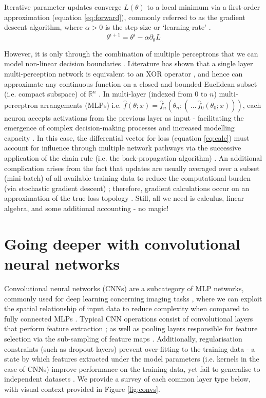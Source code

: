 Iterative parameter updates converge $L(\theta)$ to a local minimum via a first-order approximation (equation \ref{eq:forward}), commonly referred to as the gradient descent algorithm, where $\alpha>0$ is the step-size or `learning-rate' \cite{Maier2019}.
\begin{equation}
\theta^{i+1} = \theta^{i} - \alpha \partial_{\theta} L 
\label{eq:forward}
\end{equation}

However, it is only through the combination of multiple perceptrons that we can model non-linear decision boundaries \cite{Maier2019}. Literature has shown that a single layer multi-perception network is equivalent to an XOR operator \cite{Yanling}, and hence can approximate any continuous function on a closed and bounded Euclidean subset (i.e. compact subspace) of $\mathbb{R}^{n}$ \cite{Cybenko1989}. In multi-layer (indexed from $0$ to $n$) multi-perceptron arrangements (MLPs) i.e. $\hat{f}(\theta; x)= \hat{f}_{n}(\theta_{n};(\,... \,\hat{f}_{0}(\theta_{0}; x)))$, each neuron accepts activations from the previous layer as input - facilitating the emergence of complex decision-making processes and increased modelling capacity \cite{Maier2019}. In this case, the differential vector for loss (equation \ref{eq:calc}) must account for influence through multiple network pathways via the successive application of the chain rule (i.e. the back-propagation algorithm) \cite{Maier2019}. An additional complication arises from the fact that updates are usually averaged over a subset (mini-batch) of all available training data to reduce the computational burden (via stochastic gradient descent) \cite{Sun2019}; therefore, gradient calculations occur on an approximation of the true loss topology \cite{Sun2019}. Still, all we need is calculus, linear algebra, and some additional accounting - no magic!


\section{Going deeper with convolutional neural networks}
Convolutional neural networks (CNNs) are a subcategory of MLP networks, commonly used for deep learning concerning imaging tasks \cite{Maier2019}, where we can exploit the spatial relationship of input data to reduce complexity when compared to fully connected MLPs \cite{Lundervold2019}. Typical CNN operations consist of convolutional layers that perform feature extraction \cite{Hesamian2019}; as well as pooling layers responsible for feature selection via the sub-sampling of feature maps \cite{Ronneberger_2015}. Additionally, regularisation constraints (such as dropout layers) prevent over-fitting to the training data - a state by which features extracted under the model parameters (i.e. kernels in the case of CNNs) improve performance on the training data, yet fail to generalise to independent datasets \cite{Lundervold2019}. We provide a survey of each common layer type below, with visual context provided in Figure \ref{fig:convs}.

